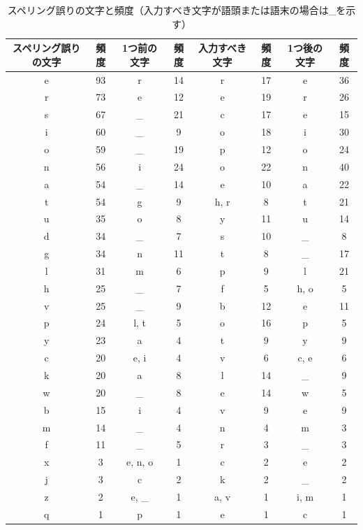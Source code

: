 \documentclass{jarticle}
\begin{document}
 \begin{table}[t]
  \small
  \begin{center}
   \caption{スペリング誤りの文字と頻度（入力すべき文字が語頭または語末の場合は\_を示す）}
   \begin{tabular}{|c|c|c|c|c|c|c|c|} \hline
       	スペリング誤りの文字 & 頻度 & 1つ前の文字 & 頻度 & 入力すべき文字 & 頻度 & 1つ後の文字 & 頻度\\ \hline
	    e & 93 & r & 14 & r & 17 & e & 36 \\ \hline
	    r & 73 & e & 12 & e & 19 & r & 26 \\ \hline
	    s & 67 & \_ & 21 & c & 17 & e & 15\\ \hline
	    i & 60 & \_ & 9 & o & 18 & i & 30\\ \hline
	    o & 59 & \_ & 19 & p & 12 & o & 24\\ \hline
	    n & 56 & i & 24 & o & 22 & n & 40\\ \hline
	    a & 54 & \_ & 14 & e & 10 & a & 22\\ \hline
	    t & 54 & g & 9 & h, r & 8 & t & 21\\ \hline
	    u & 35 & o & 8 & y & 11 & u & 14\\ \hline
	    d & 34 & \_ & 7 & s & 10 & \_ & 8\\ \hline
	    g & 34 & n & 11 & t & 8 & \_ & 17\\ \hline
	    l & 31 & m & 6 & p & 9 & l & 21\\ \hline
	    h & 25 & \_ & 7 & f & 5 & h, o & 5\\ \hline
	    v & 25 & \_ & 9 & b & 12 & e & 11\\ \hline
	    p & 24 & l, t & 5 & o & 16 & p & 5\\ \hline
	    y & 23 & a & 4 & t & 9 & y & 9\\ \hline
	    c & 20 & e, i & 4 & v & 6 & c, e & 6\\ \hline
	    k & 20 & a & 8 & l & 14 & \_ & 9\\ \hline
	    w & 20 & \_ & 8 & e & 14 & w & 5\\ \hline
	    b & 15 & i & 4 & v & 9 & e & 9\\ \hline
	    m & 14 & \_ & 4 & n & 4 & m & 3\\ \hline
	    f & 11 & \_ & 5 & r & 3 & \_ & 3\\ \hline
	    x & 3 & e, n, o & 1 & c & 2 & e & 2\\ \hline
	    j & 3 & c & 2 & k & 2 & \_ & 2\\ \hline
	    z & 2 & e, \_ & 1 & a, v & 1 & i, m & 1\\ \hline
	    q & 1 & p & 1 & e & 1 & c & 1\\ \hline
   \end{tabular}
  \end{center}
 \end{table}
\end{document}
